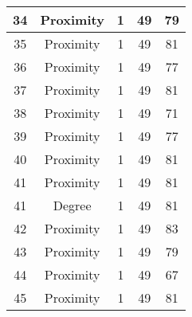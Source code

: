 \documentclass[results.tex]{subfiles}
\begin{document}
\begin{center}
\begin{tabular}{| c || c | c | c | c |}
            \hline
            34                      & Proximity                    & 1                      & 49                      & 79                   \\
            \hline
            35                      & Proximity                    & 1                      & 49                      & 81                   \\
            \hline
            36                      & Proximity                    & 1                      & 49                      & 77                   \\
            \hline
            37                      & Proximity                    & 1                      & 49                      & 81                   \\
            \hline
            38                      & Proximity                    & 1                      & 49                      & 71                   \\
            \hline
            39                      & Proximity                    & 1                      & 49                      & 77                   \\
            \hline
            40                      & Proximity                    & 1                      & 49                      & 81                   \\
            \hline
            41                      & Proximity                    & 1                      & 49                      & 81                   \\
            \hline
            41                      & Degree                       & 1                      & 49                      & 81                   \\
            \hline
            42                      & Proximity                    & 1                      & 49                      & 83                   \\
            \hline
            43                      & Proximity                    & 1                      & 49                      & 79                   \\
            \hline
            44                      & Proximity                    & 1                      & 49                      & 67                   \\
            \hline
            45                      & Proximity                    & 1                      & 49                      & 81                   \\

\end{tabular}
\end{center}
\end{document}
